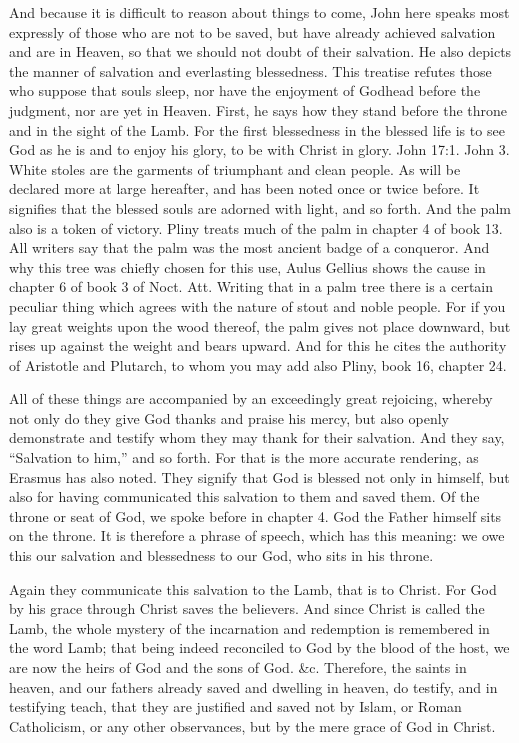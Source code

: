And because it is difficult to reason about things to come, John here speaks most expressly of those who are not to be saved, but have already achieved salvation and are in Heaven, so that we should not doubt of their salvation. He also depicts the manner of salvation and everlasting blessedness. This treatise refutes those who suppose that souls sleep, nor have the enjoyment of Godhead before the judgment, nor are yet in Heaven. First, he says how they stand before the throne and in the sight of the Lamb. For the first blessedness in the blessed life is to see God as he is and to enjoy his glory, to be with Christ in glory. John 17:1. John 3. White stoles are the garments of triumphant and clean people. As will be declared more at large hereafter, and has been noted once or twice before. It signifies that the blessed souls are adorned with light, and so forth. And the palm also is a token of victory. Pliny treats much of the palm in chapter 4 of book 13. All writers say that the palm was the most ancient badge of a conqueror. And why this tree was chiefly chosen for this use, Aulus Gellius shows the cause in chapter 6 of book 3 of Noct. Att. Writing that in a palm tree there is a certain peculiar thing which agrees with the nature of stout and noble people. For if you lay great weights upon the wood thereof, the palm gives not place downward, but rises up against the weight and bears upward. And for this he cites the authority of Aristotle and Plutarch, to whom you may add also Pliny, book 16, chapter 24.

All of these things are accompanied by an exceedingly great rejoicing, whereby not only do they give God thanks and praise his mercy, but also openly demonstrate and testify whom they may thank for their salvation. And they say, “Salvation to him,” and so forth. For that is the more accurate rendering, as Erasmus has also noted. They signify that God is blessed not only in himself, but also for having communicated this salvation to them and saved them. Of the throne or seat of God, we spoke before in chapter 4. God the Father himself sits on the throne. It is therefore a phrase of speech, which has this meaning: we owe this our salvation and blessedness to our God, who sits in his throne.

Again they communicate this salvation to the Lamb, that is to Christ. For God by his grace through Christ saves the believers. And since Christ is called the Lamb, the whole mystery of the incarnation and redemption is remembered in the word Lamb; that being indeed reconciled to God by the blood of the host, we are now the heirs of God and the sons of God. \&c. Therefore, the saints in heaven, and our fathers already saved and dwelling in heaven, do testify, and in testifying teach, that they are justified and saved not by Islam, or Roman Catholicism, or any other observances, but by the mere grace of God in Christ.

